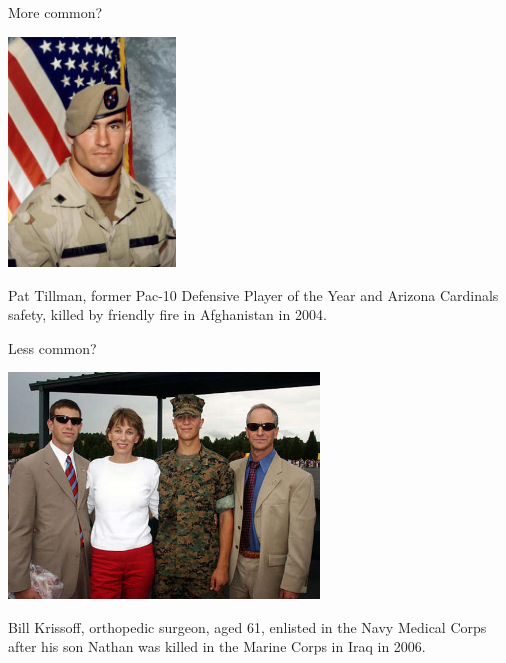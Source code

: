 \documentclass{beamer}
\begin{document}
\begin{frame}{More common?}
\centerline{\includegraphics[width=1.75in]{./Images/Tillman.PNG}}
Pat Tillman, former Pac-10 Defensive Player of the Year and Arizona Cardinals safety, killed by friendly fire in Afghanistan in 2004.
\end{frame}

\begin{frame}{Less common?}
\centerline{\includegraphics[width=3.25in]{./Images/Krissoff.PNG}}

Bill Krissoff, orthopedic surgeon, aged 61, enlisted in the Navy Medical Corps after his son Nathan was killed in the Marine Corps in Iraq in 2006.
\end{frame}
\end{document}
